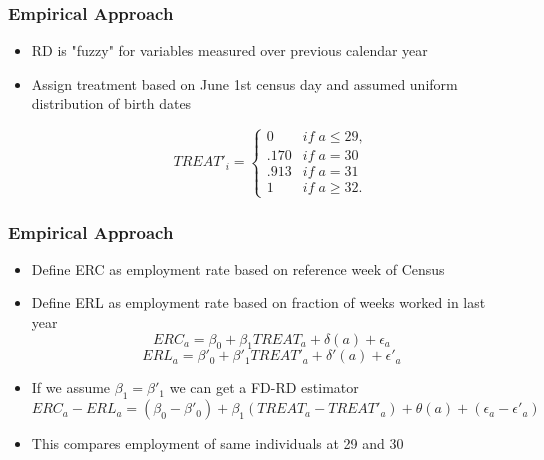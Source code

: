 \documentclass{beamer}
\begin{document}

\begin{frame}
\frametitle{Empirical Approach}

\begin{itemize}
	\item RD is "fuzzy" for variables measured over previous calendar year 
	\item Assign treatment based on June 1st census day and assumed uniform distribution of birth dates 
	
	$$ TREAT'_i = \begin{cases} 
	0 & if \; a \leq 29, \\
	.170 & if \; a = 30 \\
	.913 & if \; a = 31 \\
	1 & if \; a \geq 32.
	\end{cases}$$
	
	
\end{itemize}

\end{frame}



\begin{frame}
	\frametitle{Empirical Approach}
	\begin{itemize}
		\item Define ERC as employment rate based on reference week of Census 
		\item Define ERL as employment rate based on fraction of weeks worked in last year
		$$ ERC_a = \beta_0 + \beta_1TREAT_a + \delta(a) + \epsilon_a$$
		$$ERL_a = \beta'_0 + \beta'_1TREAT'_a + \delta'(a) + \epsilon'_a$$
		
		\item If we assume $\beta_1 = \beta'_1$ we can get a FD-RD estimator 
		$$ERC_a-ERL_a = (\beta_0 - \beta'_0) + \beta_1(TREAT_a - TREAT'_a) + \theta(a) + (\epsilon_a - \epsilon'_a)$$
		\item This compares employment of same individuals at 29 and 30 
	\end{itemize}
	
	
	
	
\end{frame}
\end{document}
